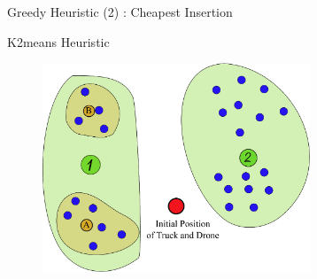 \documentclass{beamer}
\begin{document}
\begin{frame}{Greedy Heuristic (2) : Cheapest Insertion }
\end{frame}

\begin{frame}{K2means Heuristic}
   \begin{figure}[H]
    \centering
    \includegraphics[width=8.0cm]{../img/k2means_explain.eps}
  \end{figure}

\end{frame}
\end{document}
